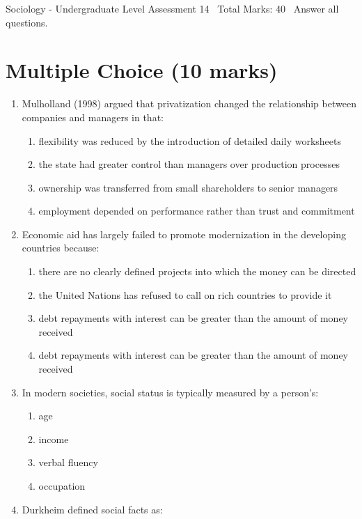 \documentclass[12pt]{article}
\begin{document}
\begin{center}
Sociology - Undergraduate Level Assessment 14 \
Total Marks: 40 \
Answer all questions.
\end{center}

\section*{Multiple Choice (10 marks)}
\begin{enumerate}[label=\arabic*.]
\item Mulholland (1998) argued that privatization changed the relationship between companies and managers in that:
\begin{enumerate}[label=(\alph*)]
    \item flexibility was reduced by the introduction of detailed daily worksheets
    \item the state had greater control than managers over production processes
    \item ownership was transferred from small shareholders to senior managers
    \item employment depended on performance rather than trust and commitment
\end{enumerate}
\item Economic aid has largely failed to promote modernization in the developing countries because:
\begin{enumerate}[label=(\alph*)]
    \item there are no clearly defined projects into which the money can be directed
    \item the United Nations has refused to call on rich countries to provide it
    \item debt repayments with interest can be greater than the amount of money received
    \item debt repayments with interest can be greater than the amount of money received
\end{enumerate}
\item In modern societies, social status is typically measured by a person's:
\begin{enumerate}[label=(\alph*)]
    \item age
    \item income
    \item verbal fluency
    \item occupation
\end{enumerate}
\item Durkheim defined social facts as:

\end{enumerate}
\end{document}
